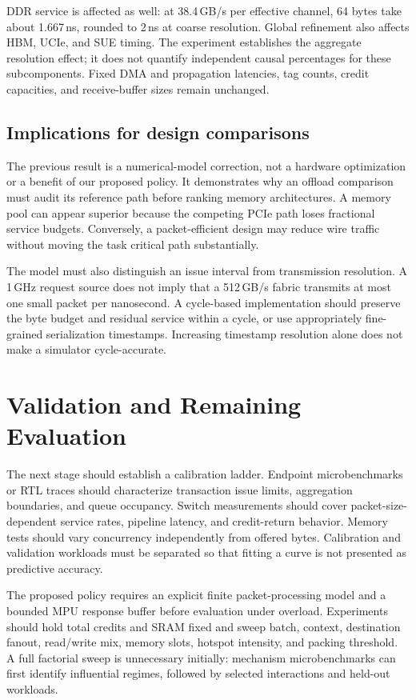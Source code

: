 \documentclass[conference]{IEEEtran}
\begin{document}
DDR service is affected as well: at 38.4\,GB/s per effective channel, 64 bytes take about 1.667\,ns, rounded to 2\,ns at coarse resolution. Global refinement also affects HBM, UCIe, and SUE timing. The experiment establishes the aggregate resolution effect; it does not quantify independent causal percentages for these subcomponents. Fixed DMA and propagation latencies, tag counts, credit capacities, and receive-buffer sizes remain unchanged.

\subsection{Implications for design comparisons}
The previous result is a numerical-model correction, not a hardware optimization or a benefit of our proposed policy. It demonstrates why an offload comparison must audit its reference path before ranking memory architectures. A memory pool can appear superior because the competing PCIe path loses fractional service budgets. Conversely, a packet-efficient design may reduce wire traffic without moving the task critical path substantially.

The model must also distinguish an issue interval from transmission resolution. A 1\,GHz request source does not imply that a 512\,GB/s fabric transmits at most one small packet per nanosecond. A cycle-based implementation should preserve the byte budget and residual service within a cycle, or use appropriately fine-grained serialization timestamps. Increasing timestamp resolution alone does not make a simulator cycle-accurate.



\section{Validation and Remaining Evaluation}
The next stage should establish a calibration ladder. Endpoint microbenchmarks or RTL traces should characterize transaction issue limits, aggregation boundaries, and queue occupancy. Switch measurements should cover packet-size-dependent service rates, pipeline latency, and credit-return behavior. Memory tests should vary concurrency independently from offered bytes. Calibration and validation workloads must be separated so that fitting a curve is not presented as predictive accuracy.

The proposed policy requires an explicit finite packet-processing model and a bounded MPU response buffer before evaluation under overload. Experiments should hold total credits and SRAM fixed and sweep batch, context, destination fanout, read/write mix, memory slots, hotspot intensity, and packing threshold. A full factorial sweep is unnecessary initially: mechanism microbenchmarks can first identify influential regimes, followed by selected interactions and held-out workloads.
\end{document}
